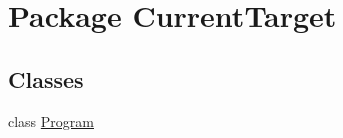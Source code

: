 \hypertarget{namespace_current_target}{\section{Package Current\-Target}
\label{namespace_current_target}
}
\subsection*{Classes}
\begin{DoxyCompactItemize}
\item 
class \hyperlink{class_current_target_1_1_program}{Program}
\end{DoxyCompactItemize}
